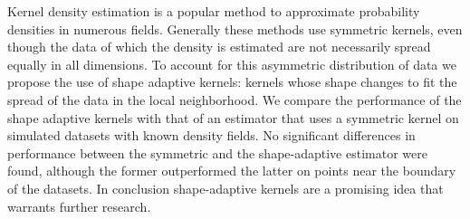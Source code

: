 \noindent Kernel density estimation is a popular method to approximate probability densities in numerous fields.
Generally these methods use symmetric kernels, even though the data of which the density is estimated are not necessarily spread equally in all dimensions. To account for this asymmetric distribution of data we propose the use of shape adaptive kernels: kernels whose shape changes to fit the spread of the data in the local neighborhood.
We compare the performance of the shape adaptive kernels with that of an estimator that uses a symmetric kernel on simulated datasets with known density fields.
No significant differences in performance between the symmetric and the shape-adaptive estimator were found, although the former outperformed the latter on points near the boundary of the datasets.  
In conclusion shape-adaptive kernels are a promising idea that warrants further research.
